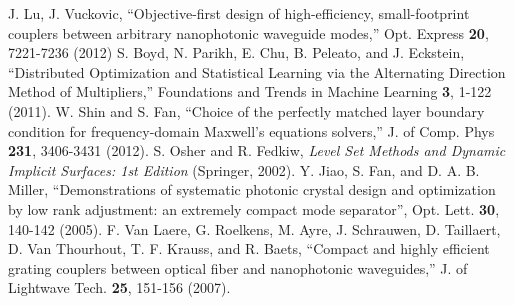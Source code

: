 \documentclass[letterpaper,10pt]{article}
\begin{document}
\begin{thebibliography}{99}
 J. Lu, J. Vuckovic, ``Objective-first design of high-efficiency, small-footprint couplers between arbitrary nanophotonic waveguide modes,'' 
    Opt. Express \textbf{20}, 7221-7236 (2012)
 S. Boyd, N. Parikh, E. Chu, B. Peleato, and J. Eckstein,
    ``Distributed Optimization and Statistical Learning via the Alternating Direction Method of Multipliers,''
    Foundations and Trends in Machine Learning \textbf{3}, 1-122 (2011). 
 W. Shin and S. Fan, ``Choice of the perfectly matched layer boundary condition for frequency-domain Maxwell’s equations solvers,''
    J. of Comp. Phys \textbf{231}, 3406-3431 (2012).
 S. Osher and R. Fedkiw, \emph{Level Set Methods and Dynamic Implicit Surfaces: 1st Edition} (Springer, 2002).
 Y. Jiao, S. Fan, and D. A. B. Miller, 
    ``Demonstrations of systematic photonic crystal design and optimization by low rank adjustment: an extremely compact mode separator'', Opt. Lett. \textbf{30}, 140-142 (2005).
F. Van Laere, G. Roelkens, M. Ayre, J. Schrauwen, D. Taillaert, D. Van Thourhout, T. F. Krauss, and R. Baets,
    ``Compact and highly efficient grating couplers between optical fiber and nanophotonic waveguides,''
    J. of Lightwave Tech. \textbf{25}, 151-156 (2007).

\end{thebibliography}
\end{document}
